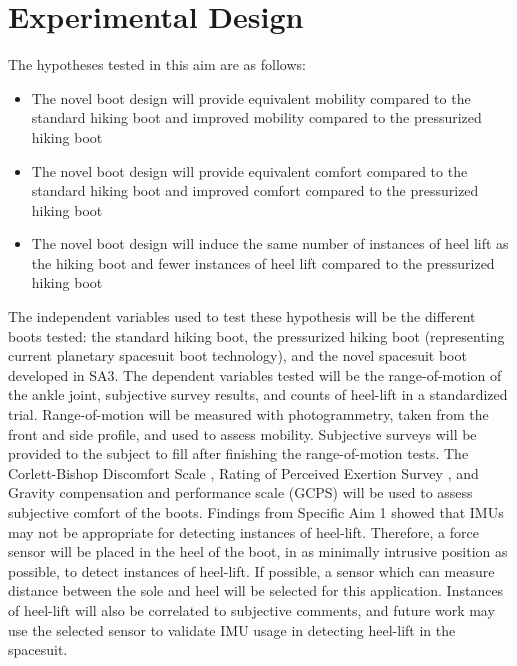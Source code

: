 \documentclass[defaultstyle,11pt]{comps}
\providecommand{\tightlist}{%
  \setlength{\itemsep}{0pt}\setlength{\parskip}{0pt}}
\providecommand{\DIFaddbegin}{} %
\providecommand{\DIFaddend}{} %
\providecommand{\DIFdelbegin}{} %
\providecommand{\DIFdelend}{} %
\newcommand{\DIFscaledelfig}{0.5}
\newlength{\DIFdelgraphicswidth} %
\newlength{\DIFdelgraphicsheight} %
\newcommand{\DIFaddincludegraphics}[2][]{{\color{blue}\fbox{\DIFOincludegraphics[#1]{#2}}}} %
\newcommand{\DIFdelincludegraphics}[2][]{%
\sbox{\DIFdelgraphicsbox}{\DIFOincludegraphics[#1]{#2}}%
\settoboxwidth{\DIFdelgraphicswidth}{\DIFdelgraphicsbox} %
\settoboxtotalheight{\DIFdelgraphicsheight}{\DIFdelgraphicsbox} %
\scalebox{\DIFscaledelfig}{%
\parbox[b]{\DIFdelgraphicswidth}{\usebox{\DIFdelgraphicsbox}\\[-\baselineskip] \rule{\DIFdelgraphicswidth}{0em}}\llap{\resizebox{\DIFdelgraphicswidth}{\DIFdelgraphicsheight}{%
\setlength{\unitlength}{\DIFdelgraphicswidth}%
\begin{picture}(1,1)%
\thicklines\linethickness{2pt} %
{\color[rgb]{1,0,0}\put(0,0){\framebox(1,1){}}}%
{\color[rgb]{1,0,0}\put(0,0){\line( 1,1){1}}}%
{\color[rgb]{1,0,0}\put(0,1){\line(1,-1){1}}}%
\end{picture}%
}\hspace*{3pt}}} %
} %
\DeclareRobustCommand{\DIFaddbegin}{\DIFOaddbegin \let\includegraphics\DIFaddincludegraphics} %
\DeclareRobustCommand{\DIFaddend}{\DIFOaddend \let\includegraphics\DIFOincludegraphics} %
\DeclareRobustCommand{\DIFdelbegin}{\DIFOdelbegin \let\includegraphics\DIFdelincludegraphics} %
\DeclareRobustCommand{\DIFdelend}{\DIFOaddend \let\includegraphics\DIFOincludegraphics} %
\begin{document}
\DIFdelbegin %
\DIFdelend \DIFaddbegin \hypertarget{experimental-design}{%
\section{Experimental Design}\label{experimental-design}}
\DIFaddend 

The hypotheses tested in this aim are as follows:

\begin{itemize}
\tightlist
\item
  The novel boot design will provide equivalent mobility compared to the standard hiking boot and improved mobility compared to the pressurized hiking boot
\item
  The novel boot design will provide equivalent comfort compared to the standard hiking boot and improved comfort compared to the pressurized hiking boot
\item
  The novel boot design will induce the same number of instances of heel lift as the hiking boot and fewer instances of heel lift compared to the pressurized hiking boot
\end{itemize}

The independent variables used to test these hypothesis will be the different boots tested: the standard hiking boot, the pressurized hiking boot (representing current planetary spacesuit boot technology), and the novel spacesuit boot developed in SA3.
The dependent variables tested will be the range-of-motion of the ankle joint, subjective survey results, and counts of heel-lift in a standardized trial.
Range-of-motion will be measured with photogrammetry, taken from the front and side profile, and used to assess mobility.
Subjective surveys will be provided to the subject to fill after finishing the range-of-motion tests.
The Corlett-Bishop Discomfort Scale \citep{Corlett1976}, Rating of Perceived Exertion Survey \citep{Borg1982}, and Gravity compensation and performance scale (GCPS) \citep{Gernhardt2009, Norcross2009, Norcross2010} will be used to assess subjective comfort of the boots.
Findings from Specific Aim 1 showed that IMUs may not be appropriate for detecting instances of heel-lift.
Therefore, a force sensor will be placed in the heel of the boot, in as minimally intrusive position as possible, to detect instances of heel-lift.
If possible, a sensor which can measure distance between the sole and heel will be selected for this application.
Instances of heel-lift will also be correlated to subjective comments, and future work may use the selected sensor to validate IMU usage in detecting heel-lift in the spacesuit.
\end{document}
